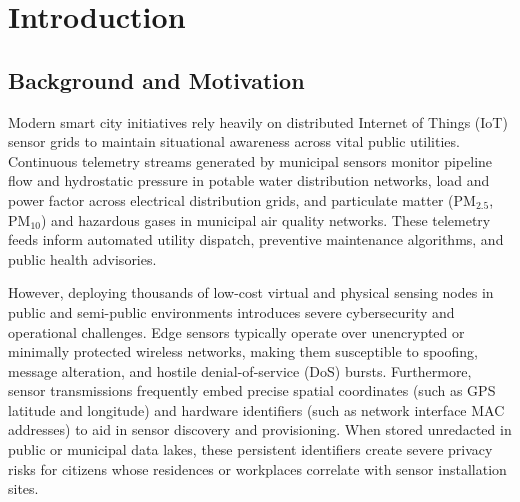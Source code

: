 \section{Introduction}

\subsection{Background and Motivation}
Modern smart city initiatives rely heavily on distributed Internet of Things (IoT) sensor grids to maintain situational awareness across vital public utilities. Continuous telemetry streams generated by municipal sensors monitor pipeline flow and hydrostatic pressure in potable water distribution networks, load and power factor across electrical distribution grids, and particulate matter ($\text{PM}_{2.5}$, $\text{PM}_{10}$) and hazardous gases in municipal air quality networks. These telemetry feeds inform automated utility dispatch, preventive maintenance algorithms, and public health advisories.

However, deploying thousands of low-cost virtual and physical sensing nodes in public and semi-public environments introduces severe cybersecurity and operational challenges. Edge sensors typically operate over unencrypted or minimally protected wireless networks, making them susceptible to spoofing, message alteration, and hostile denial-of-service (DoS) bursts. Furthermore, sensor transmissions frequently embed precise spatial coordinates (such as GPS latitude and longitude) and hardware identifiers (such as network interface MAC addresses) to aid in sensor discovery and provisioning. When stored unredacted in public or municipal data lakes, these persistent identifiers create severe privacy risks for citizens whose residences or workplaces correlate with sensor installation sites.

